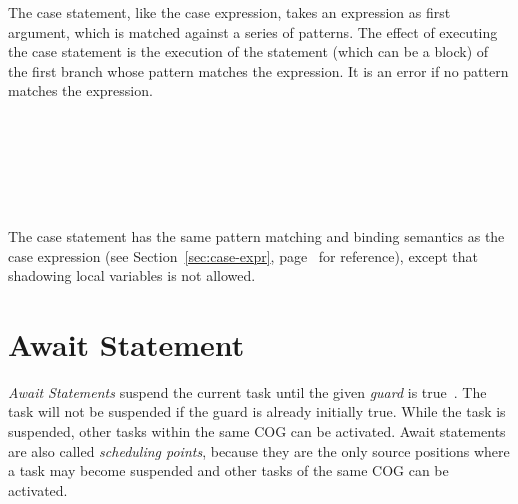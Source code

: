 The case statement, like the case expression, takes an expression as
first argument, which is matched against a series of patterns.  The
effect of executing the case statement is the execution of the statement
(which can be a block) of the first branch whose pattern matches the
expression.  It is an error if no pattern matches the expression.


\begin{abssyntax}
        {}\ \ \TRS{\{} \ \TRS{\}}\\
     {}\ \TRS{=>}\ \ \TRS{;}\\
        {}
                  {}
                  {}
                  \TRS{\_}\\
  {}\ \\
    {}\ 
\end{abssyntax}

The case statement has the same pattern matching and binding semantics
as the case expression (see Section~\ref{sec:case-expr},
page~\pageref{sec:case-expr} for reference), except that shadowing local
variables is not allowed.


\section{Await Statement}
\emph{Await Statements} suspend the current task until the given
\emph{guard} is true~\cite{johnsen10fmco}. The task will not be
suspended if the guard is already initially true.  While the task is
suspended, other tasks within the same COG can be activated.  Await
statements are also called \emph{scheduling points}, because they are
the only source positions where a task may become suspended and other
tasks of the same COG can be activated.


\begin{abssyntax}
   {}\ \ \TRS{;}\\
       {}
               {}
               {}\ \TRS{\&}\ \\
  {}\ 
               {}\ 
\end{abssyntax}

